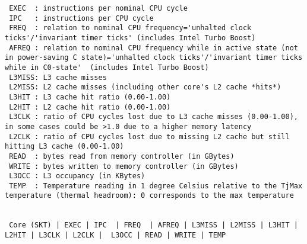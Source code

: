 \begin{lstlisting}
 EXEC  : instructions per nominal CPU cycle
 IPC   : instructions per CPU cycle
 FREQ  : relation to nominal CPU frequency='unhalted clock ticks'/'invariant timer ticks' (includes Intel Turbo Boost)
 AFREQ : relation to nominal CPU frequency while in active state (not in power-saving C state)='unhalted clock ticks'/'invariant timer ticks while in C0-state'  (includes Intel Turbo Boost)
 L3MISS: L3 cache misses
 L2MISS: L2 cache misses (including other core's L2 cache *hits*)
 L3HIT : L3 cache hit ratio (0.00-1.00)
 L2HIT : L2 cache hit ratio (0.00-1.00)
 L3CLK : ratio of CPU cycles lost due to L3 cache misses (0.00-1.00), in some cases could be >1.0 due to a higher memory latency
 L2CLK : ratio of CPU cycles lost due to missing L2 cache but still hitting L3 cache (0.00-1.00)
 READ  : bytes read from memory controller (in GBytes)
 WRITE : bytes written to memory controller (in GBytes)
 L3OCC : L3 occupancy (in KBytes)
 TEMP  : Temperature reading in 1 degree Celsius relative to the TjMax temperature (thermal headroom): 0 corresponds to the max temperature


 Core (SKT) | EXEC | IPC  | FREQ  | AFREQ | L3MISS | L2MISS | L3HIT | L2HIT | L3CLK | L2CLK |  L3OCC | READ | WRITE | TEMP


\end{lstlisting}
